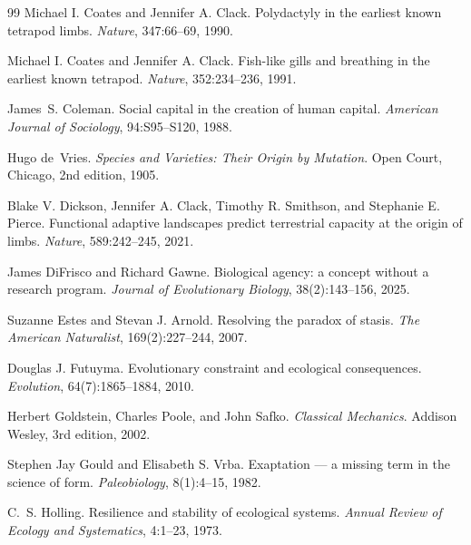 \documentclass[11pt,a4paper]{article}
\theoremstyle{remark}
\begin{document}
\begin{thebibliography}{99}
Michael I. Coates and Jennifer A. Clack.
\newblock Polydactyly in the earliest known tetrapod limbs.
\newblock \emph{Nature}, 347:66--69, 1990.

Michael I. Coates and Jennifer A. Clack.
\newblock Fish-like gills and breathing in the earliest known tetrapod.
\newblock \emph{Nature}, 352:234--236, 1991.

James~S. Coleman.
\newblock Social capital in the creation of human capital.
\newblock \emph{American Journal of Sociology}, 94:S95--S120, 1988.

Hugo de~Vries.
\newblock \emph{Species and Varieties: Their Origin by Mutation}.
\newblock Open Court, Chicago, 2nd edition, 1905.

Blake V. Dickson, Jennifer A. Clack, Timothy R. Smithson, and Stephanie E. Pierce.
\newblock Functional adaptive landscapes predict terrestrial capacity at the origin of limbs.
\newblock \emph{Nature}, 589:242--245, 2021.

James DiFrisco and Richard Gawne.
\newblock Biological agency: a concept without a research program.
\newblock \emph{Journal of Evolutionary Biology}, 38(2):143--156, 2025.

Suzanne Estes and Stevan J. Arnold.
\newblock Resolving the paradox of stasis.
\newblock \emph{The American Naturalist}, 169(2):227--244, 2007.

Douglas J. Futuyma.
\newblock Evolutionary constraint and ecological consequences.
\newblock \emph{Evolution}, 64(7):1865--1884, 2010.

Herbert Goldstein, Charles Poole, and John Safko.
\newblock \emph{Classical Mechanics}.
\newblock Addison Wesley, 3rd edition, 2002.

Stephen Jay Gould and Elisabeth S. Vrba.
\newblock Exaptation --- a missing term in the science of form.
\newblock \emph{Paleobiology}, 8(1):4--15, 1982.

C.~S. Holling.
\newblock Resilience and stability of ecological systems.
\newblock \emph{Annual Review of Ecology and Systematics}, 4:1--23, 1973.


\end{thebibliography}
\end{document}
